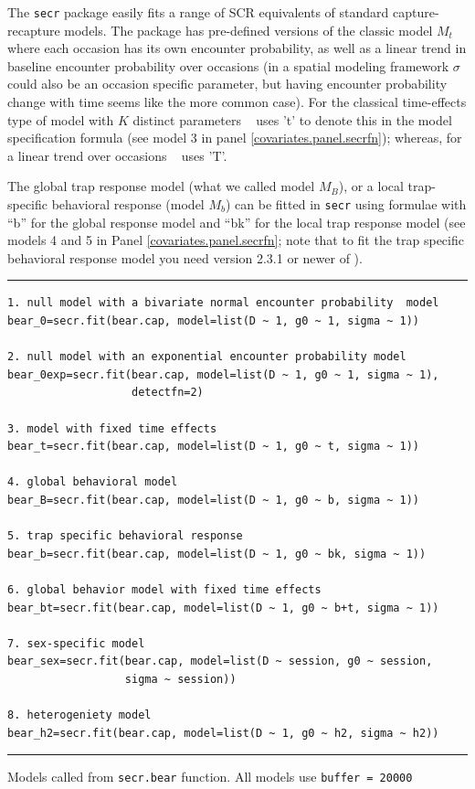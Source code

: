 The \mbox{\tt secr} package easily fits a range of SCR equivalents of
standard capture-recapture models.  The package has pre-defined
versions of the classic model $M_{t}$ where each occasion has its own
encounter probability, as well as a linear trend in baseline encounter
probability over occasions (in a spatial modeling framework $\sigma$
could also be an occasion specific parameter, but having encounter
probability change with time seems like the more common case). For the
classical time-effects type of model with $K$ distinct parameters
\secr~ uses 't' to denote this in the model specification formula (see
model 3 in panel \ref{covariates.panel.secrfn}); whereas, for a linear
trend over occasions \secr~ uses 'T'.

The global trap response model (what we called model $M_{B}$), or a
local trap-specific behavioral response (model $M_{b}$) can be fitted
in \mbox{\tt secr} using formulae with ``b'' for the global response
model and ``bk'' for the local trap response model (see models 4 and 5
in Panel \ref{covariates.panel.secrfn}; note that to fit the trap
specific behavioral response model you need version 2.3.1 or newer of
\secr).

\begin{panel}[htp]
\centering
\rule[0.1in]{\textwidth}{.03in}
{\small
\begin{verbatim}
1. null model with a bivariate normal encounter probability  model
bear_0=secr.fit(bear.cap, model=list(D ~ 1, g0 ~ 1, sigma ~ 1))

2. null model with an exponential encounter probability model
bear_0exp=secr.fit(bear.cap, model=list(D ~ 1, g0 ~ 1, sigma ~ 1),
                   detectfn=2)

3. model with fixed time effects
bear_t=secr.fit(bear.cap, model=list(D ~ 1, g0 ~ t, sigma ~ 1))

4. global behavioral model
bear_B=secr.fit(bear.cap, model=list(D ~ 1, g0 ~ b, sigma ~ 1))

5. trap specific behavioral response
bear_b=secr.fit(bear.cap, model=list(D ~ 1, g0 ~ bk, sigma ~ 1))

6. global behavior model with fixed time effects
bear_bt=secr.fit(bear.cap, model=list(D ~ 1, g0 ~ b+t, sigma ~ 1))

7. sex-specific model
bear_sex=secr.fit(bear.cap, model=list(D ~ session, g0 ~ session, 
                  sigma ~ session))

8. heterogeniety model
bear_h2=secr.fit(bear.cap, model=list(D ~ 1, g0 ~ h2, sigma ~ h2))
\end{verbatim}
}

\rule[-0.1in]{\textwidth}{.03in}
\caption{
Models called from \mbox{\tt secr.bear} function. All models use \mbox{\tt buffer = 20000}}
\label{covariates.panel.secrfn}
\end{panel}


